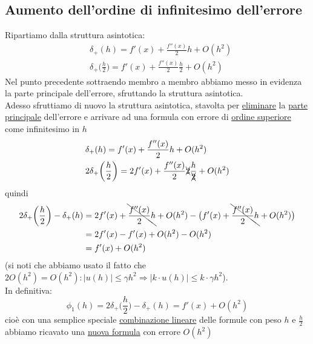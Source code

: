 \documentclass[12pt,a4paper]{article}
\begin{document}
\subsection{Aumento dell'ordine di infinitesimo dell'errore}
Ripartiamo dalla struttura asintotica:
\begin{equation*}
    \begin{split}
        & \delta_+(h) = f'(x) + \frac{f''(x)}{2}h + O(h^2) \\
        & \delta_+\biggl(\frac{h}{2}\biggr) = f'(x) + \frac{f''(x)}{2}\frac{h}{2} + O(h^2)
    \end{split}
\end{equation*}
Nel punto precedente sottraendo membro a membro abbiamo messo in evidenza la parte principale dell'errore, sfruttando la struttura asintotica.\\
Adesso sfruttiamo di nuovo la struttura asintotica, stavolta
per \uline{eliminare} la \uline{parte principale} dell'errore e arrivare ad una formula con errore di \uline{ordine superiore} come infinitesimo in $h$
\begin{equation*}
    \begin{split}
        & \delta_+(h) = f'(x) + \frac{f''(x)}{2}h + O(h^2) \\
        & 2\delta_+\biggl(\frac{h}{2}\biggr) = 2f'(x) + \frac{f''(x)}{2}\xcancel{2}\frac{h}{\xcancel{2}} + O(h^2)
    \end{split}
\end{equation*}
quindi
\begin{equation*}
    \begin{split}
        2\delta_+ \biggl(\frac{h}{2}\biggr) - \delta_+(h) & = 2f'(x)+\bcancel{\frac{f''(x)}{2}h} + O(h^2) - \bigl(f'(x) + \bcancel{\frac{f''(x)}{2}h} + O(h^2) \bigr) \\
        & = 2f'(x) - f'(x) + O(h^2) - O(h^2) \\
        & = f'(x)+O(h^2)
    \end{split}
\end{equation*}
(si noti che abbiamo usato il fatto che $2O(h^2) = O(h^2) : |u(h)|\leq\gamma h^2 \Rightarrow |k\cdot u(h)|\leq k\cdot\gamma h^2$).\\
In definitiva:
\begin{equation*}
    \phi_1(h) = 2\delta_+ \biggl(\frac{h}{2}\biggr) - \delta_+(h) = f'(x)+O(h^2)
\end{equation*}
cioè con una semplice speciale \uline{combinazione lineare} delle formule con peso $h$ e $\frac{h}{2}$ abbiamo ricavato una \uline{nuova formula} con errore $O(h^2)$
\end{document}
